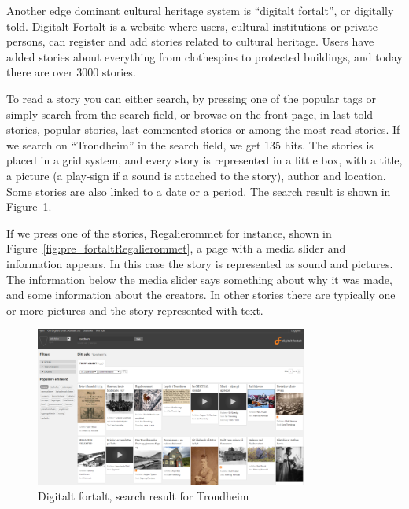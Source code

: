 \documentclass[11pt]{book}
\begin{document}
Another edge dominant cultural heritage system is ``digitalt fortalt'', or digitally told. Digitalt Fortalt is a website where users, cultural institutions or private persons, can register and add stories related to cultural heritage. Users have added stories about everything from clothespins to protected buildings, and today there are over 3000 stories. 

To read a story you can either search, by pressing one of the popular tags or simply search from the search field, or browse on the front page, in last told stories, popular stories, last commented stories or among the most  read stories. If we search on ``Trondheim'' in the search field, we get 135 hits. The stories is placed in a grid system, and every story is represented in a little box, with a title, a picture (a play-sign if a sound is attached to the story), author and location. Some stories are also linked to a date or a period. The search result is shown in Figure~\ref{fig:pre_fortaltTrondheim}.

If we press one of the stories, Regalierommet for instance, shown in Figure~\ref{fig:pre_fortaltRegalierommet}, a page with a media slider and information appears. In this case the story is represented as sound and pictures. The information below the media slider says something about why it was made, and some information about the creators. In other stories there are typically one or more pictures and the story represented with text.

\begin{figure}[H]
      \centering
      \includegraphics[width=0.8\textwidth]{Figures/Prestudy/digitaltfortaltSokTrondheim.png}
      \caption{ Digitalt fortalt, search result for Trondheim}
      \label{fig:pre_fortaltTrondheim}
\end{figure}
\end{document}
